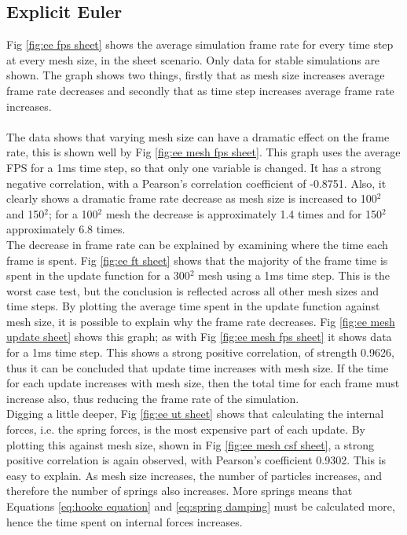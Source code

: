 \subsection{Explicit Euler}
Fig \ref{fig:ee fps sheet} shows the average simulation frame rate for every time step at every mesh size, in the sheet scenario. Only data for stable simulations are shown. The graph shows two things, firstly that as mesh size increases average frame rate decreases and secondly that as time step increases average frame rate increases.
\\\\The data shows that varying mesh size can have a dramatic effect on the frame rate, this is shown well by Fig \ref{fig:ee mesh fps sheet}. This graph uses the average FPS for a 1ms time step, so that only one variable is changed. It has a strong negative correlation, with a Pearson's correlation coefficient of -0.8751. Also, it clearly shows a dramatic frame rate decrease as mesh size is increased to 100$^{2}$ and 150$^{2}$; for a 100$^{2}$ mesh the decrease is approximately 1.4 times and for 150$^{2}$ approximately 6.8 times.
\\The decrease in frame rate can be explained by examining where the time each frame is spent. Fig \ref{fig:ee ft sheet} shows that the majority of the frame time is spent in the update function for a 300$^{2}$ mesh using a 1ms time step. This is the worst case test, but the conclusion is reflected across all other mesh sizes and time steps. By plotting the average time spent in the update function against mesh size, it is possible to explain why the frame rate decreases. Fig \ref{fig:ee mesh update sheet} shows this graph; as with Fig \ref{fig:ee mesh fps sheet} it shows data for a 1ms time step. This shows a strong positive correlation, of strength 0.9626, thus it can be concluded that update time increases with mesh size. If the time for each update increases with mesh size, then the total time for each frame must increase also, thus reducing the frame rate of the simulation. 
\\Digging a little deeper, Fig \ref{fig:ee ut sheet} shows that calculating the internal forces, i.e. the spring forces, is the most expensive part of each update. By plotting this against mesh size, shown in Fig \ref{fig:ee mesh csf sheet}, a strong positive correlation is again observed, with Pearson's coefficient 0.9302. This is easy to explain. As mesh size increases, the number of particles increases, and therefore the number of springs also increases. More springs means that Equations \ref{eq:hooke equation} and \ref{eq:spring damping} must be calculated more, hence the time spent on internal forces increases.
